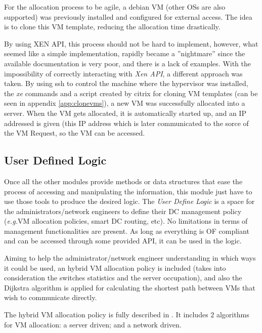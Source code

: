 \documentclass[12pt,english,oneside]{book}
\begin{document}
For the allocation process to be agile, a debian VM (other OSs are also supported) was previously installed and configured for external access. The idea is to clone this VM template, reducing the allocation time drastically.

By using XEN API, this process should not be hard to implement, however, what seemed like a simple implementation, rapidly became a ''nightmare'' since the available documentation is very poor, and there is a lack of examples.
With the impossibility of correctly interacting with \textit{Xen API}, a different approach was taken. By using ssh to control the machine where the hypervisor was installed, the \textit{xe} commands and a script created by citrix for cloning VM templates (can be seen in appendix \ref{app:clonevms}), a new VM was successfully allocated into a server.
When the VM gets allocated, it is automatically started up, and an IP addressed is given (this IP address which is later communicated to the sorce of the VM Request, so the VM can be accessed.

\subsection{User Defined Logic}
\label{subsec:userdeflog}
\hspace{0.6cm}

Once all the other modules provide methods or data structures that ease the process of accessing and manipulating the information, this module just have to use those tools to produce the desired logic.
The \textit{User Define Logic} is a space for the administrators/network engineers to define their DC management policy (\textit{e.g.}VM allocation policies, smart DC routing, etc).
No limitations in terms of management functionalities are present. As long as everything is OF compliant and can be accessed through some provided API, it can be used in the logic.

Aiming to help the administrator/network engineer understanding in which ways it could be used, an hybrid VM allocation policy is included (takes into consideration the switches statistics and the server occupation), and also the Dijkstra algorithm is applied for calculating the shortest path between VMs that wish to communicate directly.

The hybrid VM allocation policy is fully described in \cite{im2013}. It includes $2$ algorithms for VM allocation: a server driven; and a network driven.
\end{document}
